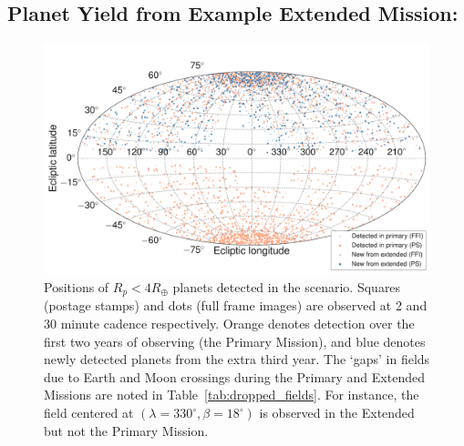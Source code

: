 \subsection{Planet Yield from Example Extended Mission: {\rm \nhemi}}
\label{sec:results_from_nhemi_extended_mission}

\begin{figure}[t]
	\centering
	\includegraphics[]{figures/skymap_dropped_fields.pdf}
	\caption{Positions of $R_p<4R_\oplus$ planets detected in the \nhemi\:scenario. Squares (postage stamps) and dots (full frame images) are observed at 2 and 30 minute cadence respectively. Orange denotes detection over the first two years of observing (the Primary Mission), and blue denotes newly detected planets from the extra third year. The `gaps' in fields due to Earth and Moon crossings during the Primary and Extended Missions are noted in Table~\protect\ref{tab:dropped_fields}. For instance, the field centered at $(\lambda=330^\circ,\beta=18^\circ)$ is observed in the Extended but not the Primary Mission. }
	\label{fig:skymap_nhemi}
\end{figure}
